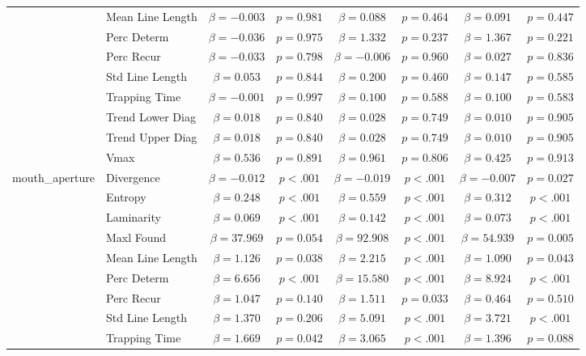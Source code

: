 \begin{tabular}{llcc|cc|cc}
 & Mean Line Length & $\beta = -0.003$ & $p = 0.981$ & $\beta = 0.088$ & $p = 0.464$ & $\beta = 0.091$ & $p = 0.447$ \\
 & Perc Determ & $\beta = -0.036$ & $p = 0.975$ & $\beta = 1.332$ & $p = 0.237$ & $\beta = 1.367$ & $p = 0.221$ \\
 & Perc Recur & $\beta = -0.033$ & $p = 0.798$ & $\beta = -0.006$ & $p = 0.960$ & $\beta = 0.027$ & $p = 0.836$ \\
 & Std Line Length & $\beta = 0.053$ & $p = 0.844$ & $\beta = 0.200$ & $p = 0.460$ & $\beta = 0.147$ & $p = 0.585$ \\
 & Trapping Time & $\beta = -0.001$ & $p = 0.997$ & $\beta = 0.100$ & $p = 0.588$ & $\beta = 0.100$ & $p = 0.583$ \\
 & Trend Lower Diag & $\beta = 0.018$ & $p = 0.840$ & $\beta = 0.028$ & $p = 0.749$ & $\beta = 0.010$ & $p = 0.905$ \\
 & Trend Upper Diag & $\beta = 0.018$ & $p = 0.840$ & $\beta = 0.028$ & $p = 0.749$ & $\beta = 0.010$ & $p = 0.905$ \\
 & Vmax & $\beta = 0.536$ & $p = 0.891$ & $\beta = 0.961$ & $p = 0.806$ & $\beta = 0.425$ & $p = 0.913$ \\
\midrule
\multirow{12}{*}{mouth_aperture} & Divergence & $\beta = -0.012$ & $p < .001$ & $\beta = -0.019$ & $p < .001$ & $\beta = -0.007$ & $p = 0.027$ \\
 & Entropy & $\beta = 0.248$ & $p < .001$ & $\beta = 0.559$ & $p < .001$ & $\beta = 0.312$ & $p < .001$ \\
 & Laminarity & $\beta = 0.069$ & $p < .001$ & $\beta = 0.142$ & $p < .001$ & $\beta = 0.073$ & $p < .001$ \\
 & Maxl Found & $\beta = 37.969$ & $p = 0.054$ & $\beta = 92.908$ & $p < .001$ & $\beta = 54.939$ & $p = 0.005$ \\
 & Mean Line Length & $\beta = 1.126$ & $p = 0.038$ & $\beta = 2.215$ & $p < .001$ & $\beta = 1.090$ & $p = 0.043$ \\
 & Perc Determ & $\beta = 6.656$ & $p < .001$ & $\beta = 15.580$ & $p < .001$ & $\beta = 8.924$ & $p < .001$ \\
 & Perc Recur & $\beta = 1.047$ & $p = 0.140$ & $\beta = 1.511$ & $p = 0.033$ & $\beta = 0.464$ & $p = 0.510$ \\
 & Std Line Length & $\beta = 1.370$ & $p = 0.206$ & $\beta = 5.091$ & $p < .001$ & $\beta = 3.721$ & $p < .001$ \\
 & Trapping Time & $\beta = 1.669$ & $p = 0.042$ & $\beta = 3.065$ & $p < .001$ & $\beta = 1.396$ & $p = 0.088$ \\

\end{tabular}
